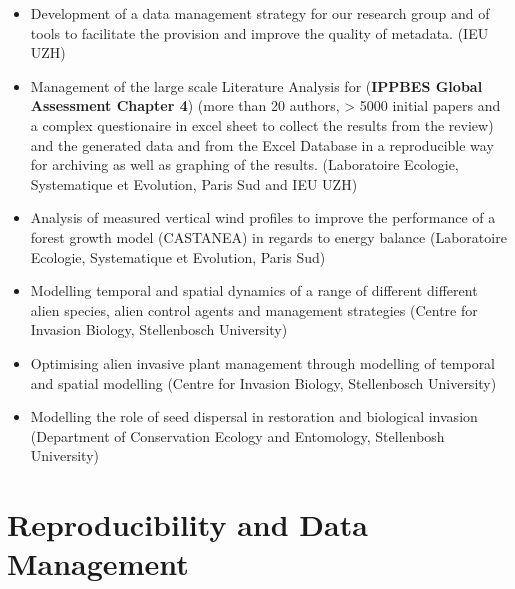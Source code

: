 \documentclass[a4paper]{article}
\begin{document}
\begin{itemize}[leftmargin=1.1in]
\item Development of a data management strategy for our research group
	and of tools to facilitate the provision and improve the quality of
	metadata. (IEU UZH)


\item Management of the large scale Literature Analysis for
	(\textbf{IPPBES Global Assessment Chapter 4}) (more than 20 authors,
	> 5000 initial papers and a complex questionaire in excel sheet to
	collect the results from the review) and the generated data and from
	the Excel Database in a reproducible way for archiving as well as
	graphing of the results. (Laboratoire Ecologie, Systematique et Evolution, Paris
	Sud and IEU UZH)

\item Analysis of measured vertical wind profiles to improve the
	performance of a forest growth model (CASTANEA) in regards to energy
	balance (Laboratoire Ecologie, Systematique et Evolution, Paris
	Sud)

\item Modelling temporal and spatial dynamics of a range of different
	different alien species, alien control agents and management
	strategies (Centre for Invasion Biology, Stellenbosch
	University)

\item Optimising alien invasive plant management through modelling of
	temporal and spatial modelling (Centre for Invasion Biology,
	Stellenbosch University)

\item Modelling the role of seed dispersal in restoration and
	biological invasion (Department of Conservation Ecology and
	Entomology, Stellenbosh University)

\end{itemize}

\section{Reproducibility and Data Management}
\end{document}
